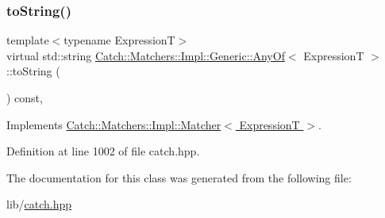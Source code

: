 \subsubsection{\texorpdfstring{to\+String()}{toString()}}
{\footnotesize\ttfamily template$<$typename ExpressionT$>$ \\
virtual std\+::string \hyperlink{class_catch_1_1_matchers_1_1_impl_1_1_generic_1_1_any_of}{Catch\+::\+Matchers\+::\+Impl\+::\+Generic\+::\+Any\+Of}$<$ ExpressionT $>$\+::to\+String (\begin{DoxyParamCaption}{ }\end{DoxyParamCaption}) const\hspace{0.3cm}{\ttfamily [inline]}, {\ttfamily [virtual]}}



Implements \hyperlink{struct_catch_1_1_matchers_1_1_impl_1_1_matcher_a091bcc37e589967d7e10fc7790d820e2}{Catch\+::\+Matchers\+::\+Impl\+::\+Matcher$<$ Expression\+T $>$}.



Definition at line 1002 of file catch.\+hpp.



The documentation for this class was generated from the following file\+:\begin{DoxyCompactItemize}
\item 
lib/\hyperlink{catch_8hpp}{catch.\+hpp}\end{DoxyCompactItemize}
